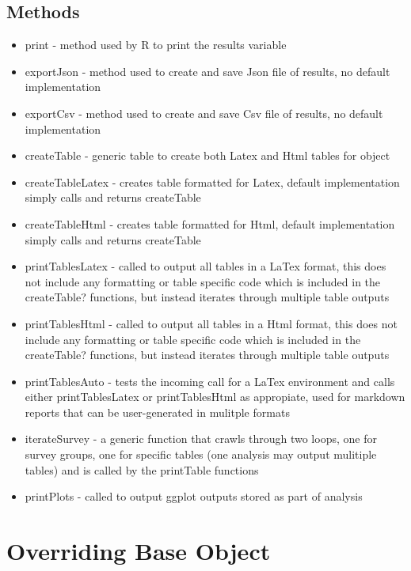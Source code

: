 \documentclass[
  letterpaper,
  DIV=11,
  numbers=noendperiod]{scrreprt}
\begin{document}
\subsection{Methods}\label{methods}

\begin{itemize}
\item
  print - method used by R to print the results variable
\item
  exportJson - method used to create and save Json file of results, no
  default implementation
\item
  exportCsv - method used to create and save Csv file of results, no
  default implementation
\item
  createTable - generic table to create both Latex and Html tables for
  object
\item
  createTableLatex - creates table formatted for Latex, default
  implementation simply calls and returns createTable
\item
  createTableHtml - creates table formatted for Html, default
  implementation simply calls and returns createTable
\item
  printTablesLatex - called to output all tables in a LaTex format, this
  does not include any formatting or table specific code which is
  included in the createTable? functions, but instead iterates through
  multiple table outputs
\item
  printTablesHtml - called to output all tables in a Html format, this
  does not include any formatting or table specific code which is
  included in the createTable? functions, but instead iterates through
  multiple table outputs
\item
  printTablesAuto - tests the incoming call for a LaTex environment and
  calls either printTablesLatex or printTablesHtml as appropiate, used
  for markdown reports that can be user-generated in mulitple formats
\item
  iterateSurvey - a generic function that crawls through two loops, one
  for survey groups, one for specific tables (one analysis may output
  mulitiple tables) and is called by the printTable functions
\item
  printPlots - called to output ggplot outputs stored as part of
  analysis
\end{itemize}

\section{Overriding Base Object}\label{overriding-base-object}
\end{document}
